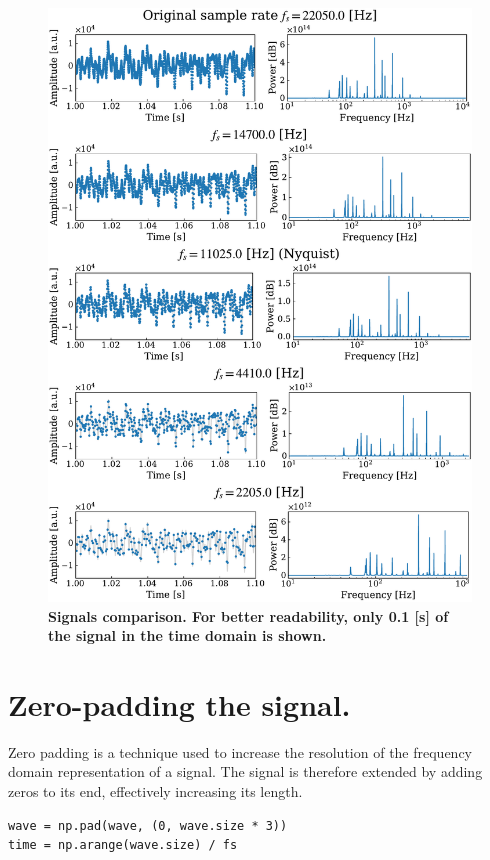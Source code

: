 \documentclass[13pt,a4paper]{article}
\begin{document}
\begin{figure}[ht!]
    \centering
    \includegraphics[width=\linewidth]{sampling_thorem.pdf}
    \caption{\textbf{Signals comparison. For better readability, only 0.1 [s] of the signal in the time domain is shown.}}
    \label{fig:sampling_thorem}
\end{figure}
\clearpage


\section{Zero-padding the signal.}

Zero padding is a technique used to increase the resolution of the frequency domain representation of a signal. The signal is therefore extended by adding zeros to its end, effectively increasing its length.

\begin{lstlisting}[caption={\textbf{Code snippet for adding the padding to infinite signal.}}]
wave = np.pad(wave, (0, wave.size * 3))
time = np.arange(wave.size) / fs
\end{lstlisting}
\end{document}
